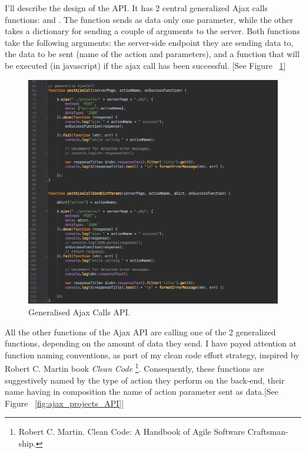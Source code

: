 I'll describe the design of the  API. It has 2 central generalized Ajax calls functions:  and . The  function sends as data only one parameter, while the other takes a dictionary for sending a couple of arguments to the server.
Both functions take the following arguments: the server-side endpoint they are sending data to, the data to be sent (name of the action and parameters), and a function that will be executed (in javascript) if the ajax call has been successful. [See Figure ~\ref{fig:general_ajax_calls}]\\ 

\begin{figure}
\includegraphics[width=1\linewidth]{images/GeneralisedAjaxCallsAPI.png}
\caption{Generalised Ajax Calls API.}
\label{fig:general_ajax_calls}
\end{figure}

All the other functions of the Ajax API are calling one of the 2 generalized functions, depending on the amount of data they send. 
I have payed attention at function naming conventions, as part of my clean code effort strategy, inspired by Robert C. Martin book \textit{Clean Code} \footnote{Robert C. Martin. Clean Code: A Handbook of Agile Software Craftsman-
ship.}. Consequently, these functions are suggestively named by the type of action they perform on the back-end, their name having in composition the name of action parameter sent as data.[See Figure ~\ref{fig:ajax_projects_API}] \\

